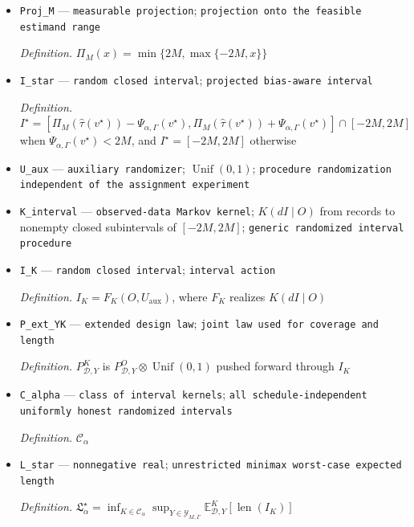 \documentclass{article}
\begin{document}
\begin{itemize}
  \par\smallskip\noindent\emph{Definition.} \(\mathfrak R_\alpha^\star=\min\{2M,\Psi_{\alpha,\Gamma}(v^\star)\}\)
  \item \texttt{Proj\_\allowbreak{}M} --- \texttt{measurable projection}; \texttt{projection onto the feasible estimand range}
  \par\smallskip\noindent\emph{Definition.} \(\Pi_M(x)=\min\{2M,\max\{-2M,x\}\}\)
  \item \texttt{I\_\allowbreak{}star} --- \texttt{random closed interval}; \texttt{projected bias-\allowbreak{}aware interval}
  \par\smallskip\noindent\emph{Definition.} \(I^\star=[\Pi_M(\widehat\tau(v^\star))-\Psi_{\alpha,\Gamma}(v^\star),\Pi_M(\widehat\tau(v^\star))+\Psi_{\alpha,\Gamma}(v^\star)]\cap[-2M,2M]\) when \(\Psi_{\alpha,\Gamma}(v^\star)<2M\), and \(I^\star=[-2M,2M]\) otherwise
  \item \texttt{U\_\allowbreak{}aux} --- \texttt{auxiliary randomizer}; \(\operatorname{Unif}(0,1)\); \texttt{procedure randomization independent of the assignment experiment}
  \item \texttt{K\_\allowbreak{}interval} --- \texttt{observed-\allowbreak{}data Markov kernel}; \(K(dI\mid O)\) from records to nonempty closed subintervals of \([-2M,2M]\); \texttt{generic randomized interval procedure}
  \item \texttt{I\_\allowbreak{}K} --- \texttt{random closed interval}; \texttt{interval action}
  \par\smallskip\noindent\emph{Definition.} \(I_K=F_K(O,U_{\mathrm{aux}})\), where \(F_K\) realizes \(K(dI\mid O)\)
  \item \texttt{P\_\allowbreak{}ext\_\allowbreak{}YK} --- \texttt{extended design law}; \texttt{joint law used for coverage and length}
  \par\smallskip\noindent\emph{Definition.} \(P^K_{\mathcal D,Y}\) is \(P^O_{\mathcal D,Y}\otimes\operatorname{Unif}(0,1)\) pushed forward through \(I_K\)
  \item \texttt{C\_\allowbreak{}alpha} --- \texttt{class of interval kernels}; \texttt{all schedule-\allowbreak{}independent uniformly honest randomized intervals}
  \par\smallskip\noindent\emph{Definition.} \(\mathcal C_\alpha\)
  \item \texttt{L\_\allowbreak{}star} --- \texttt{nonnegative real}; \texttt{unrestricted minimax worst-\allowbreak{}case expected length}
  \par\smallskip\noindent\emph{Definition.} \(\mathfrak L_\alpha^\star=\inf_{K\in\mathcal C_\alpha}\sup_{Y\in\mathcal Y_{M,\Gamma}}\mathbb E^K_{\mathcal D,Y}[\operatorname{len}(I_K)]\)

\end{itemize}
\end{document}
